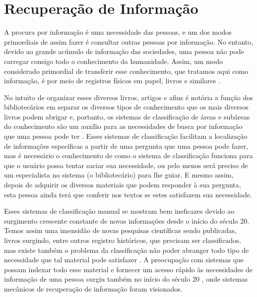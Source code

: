 \section{Recuperação de Informação} \label{sec:RecuperaçãoInformação}



A procura por informação é uma necessidade das pessoas, e um dos modos primordiais de assim fazer é consultar outras pessoas por informação.
No entanto, devido ao grande acúmulo de informação das sociedades, uma pessoa não pode carregar consigo todo o conhecimento da humanidade.
Assim, um modo considerado primordial de transferir esse conhecimento, que tratamos aqui como informação, é por meio de registros físicos em papel, livros e similares \cite[p.~1]{Grossman2004IRAH}.

No intuito de organizar esses diversos livros, artigos e afins é notória a função dos bibliotecários em separar os diversos tipos de conhecimento que os mais diversos livros podem abrigar e, portanto, os sistemas de classificação de áreas e subáreas do conhecimento são um auxílio para as necessidades de busca por informação que uma pessoa pode ter \cite[p.~1]{Manning2008IIR} \cite[p.~1446]{Sanderson2012THIRR} \cite[p.~6]{Baeza-Yates1999}. 
Esses sistemas de classificação facilitam a localização de informações específicas a partir de uma pergunta que uma pessoa pode fazer, mas é necessário o conhecimento de como o sistema de classificação funciona para que o usuário possa tentar saciar sua necessidade, ou pelo menos será preciso de um especialista no sistema (o bibliotecário) para lhe guiar.
E mesmo assim, depois de adquirir os diversos materiais que podem responder à sua pergunta, esta pessoa ainda terá que conferir nos textos se estes satisfazem sua necessidade.


Esses sistemas de classificação manual se mostram bem ineficazes devido ao surgimento crescente constante de novas informações \cite[p.~6]{Baeza-Yates1999} desde o início do século 20. 
Temos assim uma imensidão de novas pesquisas científicas sendo publicadas, livros surgindo, entre outros registro históricos, que precisam ser classificados, mas existe também o problema da classificação não poder abranger todo tipo de necessidade que tal material pode satisfazer \cite[p.~1444]{Sanderson2012THIRR}. 
A preocupação com sistemas que possam indexar todo esse material e fornecer um acesso rápido às necessidades de informação de uma pessoa surgiu também no início do século 20 \cite{Bush:1979:WMT:1113634.1113638}, onde sistemas mecânicos de recuperação de informação foram visionados.


